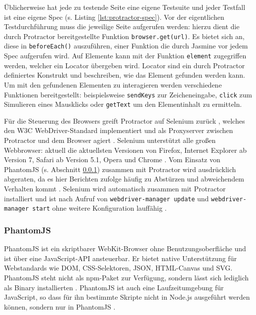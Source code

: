 \begin{figure}[H]
	
\end{figure}

Üblicherweise hat jede zu testende Seite eine eigene Testsuite und jeder Testfall ist eine eigene Spec (s. Listing \ref{lst:protractor-spec}). Vor der eigentlichen Testdurchführung muss die jeweilige Seite aufgerufen werden: hierzu dient die durch Protractor bereitgestellte Funktion \texttt{browser.get(url)}. Es bietet sich an, diese in \texttt{beforeEach()} auszuführen, einer Funktion die durch Jasmine vor jedem Spec aufgerufen wird. Auf Elemente kann mit der Funktion \texttt{element} zugegriffen werden, welcher ein Locator übergeben wird. Locator sind ein durch Protractor definiertes Konstrukt und beschreiben, wie das Element gefunden werden kann. Um mit den gefundenen Elementen zu interagieren werden verschiedene Funktionen bereitgestellt: beispielsweise \texttt{sendKeys} zur Zeicheneingabe, \texttt{click} zum Simulieren eines Mausklicks oder \texttt{getText} um den Elementinhalt zu ermitteln.

\begin{figure}[H]
	
\end{figure}

Für die Steuerung des Browsers greift Protractor auf Selenium zurück \cite{protractor-index}, welches den W3C WebDriver-Standard implementiert und als Proxyserver zwischen Protractor und dem Browser agiert \cite{selenium}. Selenium unterstützt alle großen Webbrowser: aktuell die aktuellsten Versionen von Firefox, Internet Explorer ab Version 7, Safari ab Version 5.1, Opera und Chrome \cite{selenium-browsers}. Vom Einsatz von PhantomJS (s. Abschnitt \ref{sec:PhantomJS}) zusammen mit Protractor wird ausdrücklich abgeraten, da es hier Berichten zufolge häufig zu Abstürzen und abweichendem Verhalten kommt \cite{protractor-browser}. Selenium wird automatisch zusammen mit Protractor installiert und ist nach Aufruf von \texttt{webdriver-manager update} und \texttt{webdriver-manager start} ohne weitere Konfiguration lauffähig \cite{protractor-index}.



\subsubsection{PhantomJS}
\label{sec:PhantomJS}
PhantomJS ist ein skriptbarer WebKit-Browser ohne Benutzungsoberfläche und ist über eine JavaScript-API ansteuerbar. Er bietet native Unterstützung für Webstandards wie DOM, CSS-Selektoren, JSON, HTML-Canvas und SVG. \cite{phantomjs-index} PhantomJS steht nicht als npm-Paket zur Verfügung, sondern lässt sich lediglich als Binary installierten \cite{phantomjs-faq}. PhantomJS ist auch eine Laufzeitumgebung für JavaScript, so dass für ihn bestimmte Skripte nicht in Node.js ausgeführt werden können, sondern nur in PhantomJS \cite{phantomjs-quickstart}.

